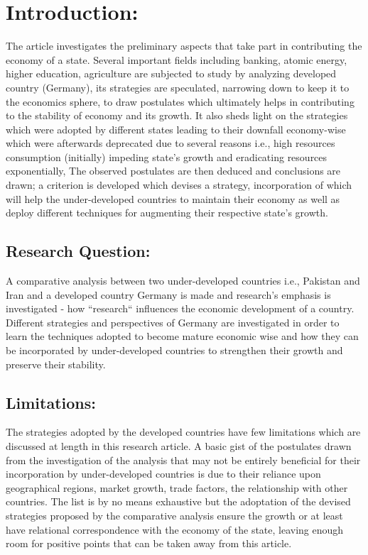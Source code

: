 \documentclass[]{article}
\begin{document}
\newpage
\tableofcontents
\newpage

\section{Introduction:}

The article investigates the preliminary aspects that take part in contributing the economy of a state. Several important fields including banking, atomic energy, higher education, agriculture are subjected to study by analyzing developed country (Germany), its strategies are speculated, narrowing down to keep it to the economics sphere, to draw postulates which ultimately helps in contributing to the stability of economy and its growth. It also sheds light on the strategies which were adopted by different states leading to their downfall economy-wise which were afterwards deprecated due to several reasons i.e., high resources consumption (initially) impeding state's growth and eradicating resources exponentially, The observed postulates are then deduced and conclusions are drawn; a criterion is developed which devises a strategy, incorporation of which will help the under-developed countries to maintain their economy as well as deploy different techniques for augmenting their respective state's growth.

\subsection{Research Question:}

A comparative analysis between two under-developed countries i.e., Pakistan and Iran and a developed country Germany is made and research's emphasis is investigated - how ``research`` influences the economic development of a country. Different strategies and perspectives of Germany are investigated in order to learn the techniques adopted to become mature economic wise and how they can be incorporated by under-developed countries to strengthen their growth and preserve their stability.

\subsection{Limitations:}

The strategies adopted by the developed countries have few limitations which are discussed at length in this research article. A basic gist of the postulates drawn from the investigation of the analysis that may not be entirely beneficial for their incorporation by under-developed countries is due to their reliance upon geographical regions, market growth, trade factors, the relationship with other countries. The list is by no means exhaustive but the adoptation of the devised strategies proposed by the comparative analysis ensure the growth or at least have relational correspondence with the economy of the state, leaving enough room for positive points that can be taken away from this article.
\end{document}
